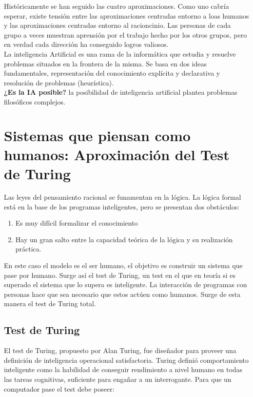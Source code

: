 \documentclass{article}
\begin{document}
Históricamente se han seguido las cuatro aproximaciones. Como uno cabría esperar, existe tensión entre las aproximaciones centradas entorno a loas humanos y las aproximaciones centradas entorno al racioncinio. Las personas de cada grupo a veces muestran aprensión por el trabajo hecho por los otros grupos, pero en verdad cada dirección ha conseguido logros valiosos. \\

La inteligencia Artificial es una rama de la informática que estudia y resuelve problemas situados en la frontera de la misma. Se basa en dos ideas fundamentales, representación del conocimiento explícita y declarativa y resolución de problemas (heurística). \\

\textbf{¿Es la IA posible?} la posibilidad de inteligencia artificial plantea problemas filosóficos complejos.

\section{Sistemas que piensan como humanos: Aproximación del Test de Turing}
Las leyes del pensamiento racional se funamentan en la lógica. La lógica formal está en la base de los programas inteligentes, pero se presentan dos obstáculos:

\begin{enumerate}
\item Es muy difícil formalizar el conocimiento

\item Hay un gran salto entre la capacidad teórica de la lógica y su realización práctica.
\end{enumerate}

En este caso el modelo es el ser humano, el objetivo es construir un sistema que pase por humano. Surge así el test de Turing, un test en el que en teoría si es superado el sistema que lo supera es inteligente. La interacción de programas con personas hace que sea necesario que estos actúen como humanos. Surge de esta manera el test de Turing total.

\subsection{Test de Turing}
El test de Turing, propuesto por Alan Turing, fue diseñador para proveer una definición de inteligencia operacional satisfactoria. Turing definió comportamiento inteligente como la habilidad de conseguir rendimiento a nivel humano en todas las tareas cognitivas, suficiente para engañar a un interrogante. Para que un computador pase el test debe poseer:
\end{document}
